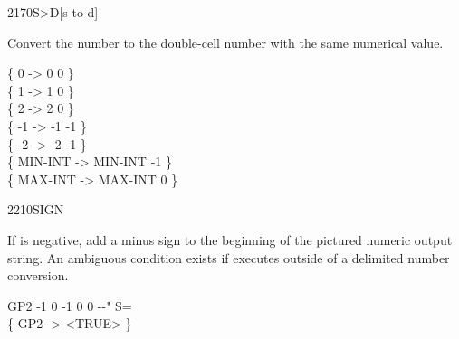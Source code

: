 \begin{worddef}[StoD]{2170}{S>D}[s-to-d]
\item {}

	Convert the number  to the double-cell number 
	with the same numerical value.

	\begin{defer}
	\testing
		\{       0  ->       0  0 \} \\
		\{       1  ->       1  0 \} \\
		\{       2  ->       2  0 \} \\
		\{      -1  ->      -1 -1 \} \\
		\{      -2  ->      -2 -1 \} \\
		\{ MIN-INT  -> MIN-INT -1 \} \\
		\{ MAX-INT  -> MAX-INT  0 \}
	\end{defer}
\end{worddef}


\begin{worddef}{2210}{SIGN}
\item {}

	If  is negative, add a minus sign to the beginning of
	the pictured numeric output string. An ambiguous condition exists
	if  executes outside of a  \word{num-end}
	delimited number conversion.

	\begin{defer}
	\testing
		\word{:} GP2   -1  0  -1  0 0   -{}-" S= \word{;} \\
		\{ GP2 -> <TRUE> \}
	\end{defer}
\end{worddef}



